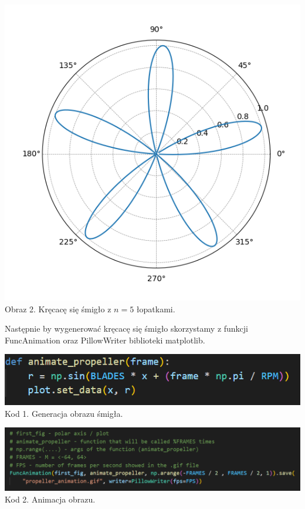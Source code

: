\documentclass[14pt]{article}
\begin{document}
\begin{center}
\begin{minipage}{7cm}
        \includegraphics[scale=0.5]{images/propeller_5.png}
        \\ \small Obraz 2. Kręcacę się śmigło z $n = 5$ łopatkami.
    \end{minipage}
\end{center}

\newpage
Następnie by wygenerować kręcacę się śmigło skorzystamy z funkcji
FuncAnimation oraz PillowWriter biblioteki matplotlib.
\begin{center}
    \includegraphics[scale=0.53]{images/animate.png}
    \\ \small Kod 1. Generacja obrazu śmigła.

    \vspace{0.25cm}
    \includegraphics[scale=0.3]{images/func_anim.png}
    \\ \small Kod 2. Animacja obrazu.
\end{center}
\end{document}
